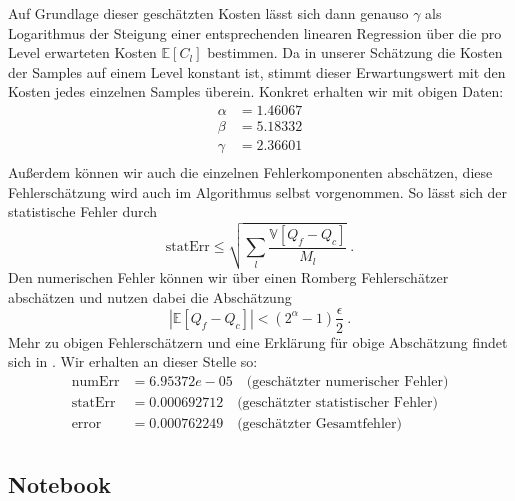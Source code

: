Auf Grundlage dieser geschätzten Kosten lässt sich dann genauso $ \gamma $ als Logarithmus der Steigung einer entsprechenden linearen Regression über die pro Level erwarteten Kosten $ \mathbb{E}[C_l] $ bestimmen. Da in unserer Schätzung die Kosten der Samples auf einem Level konstant ist, stimmt dieser Erwartungswert mit den Kosten jedes einzelnen Samples überein.  
Konkret erhalten wir mit obigen Daten: 
\begin{align*}
	\alpha  &=    1.46067   \\
	\beta   &=    5.18332   \\
	\gamma  &=    2.36601   \\
\end{align*}
Außerdem können wir auch die einzelnen Fehlerkomponenten abschätzen, diese Fehlerschätzung wird auch im Algorithmus selbst vorgenommen. So lässt sich der statistische Fehler durch \[
 \text{statErr} \leq \sqrt{\sum_l   \frac{\mathbb{V}[Q_f-Q_c]}{M_l}} \ . \] 
Den numerischen Fehler können wir über einen Romberg Fehlerschätzer abschätzen und nutzen dabei die Abschätzung \[ \left| \mathbb{E}[Q_f-Q_c] \right| < (2^{\alpha}-1)\frac{\epsilon}{2} \ . \] Mehr zu obigen Fehlerschätzern und eine Erklärung für obige Abschätzung findet sich in \cite{giles_2015}.
Wir erhalten an dieser Stelle so: 
\begin{align*}
\text{numErr}  &= 6.95372e-05   \quad \text{(geschätzter numerischer Fehler)}\\
\text{statErr} &= 0.000692712  \quad  \text{(geschätzter statistischer Fehler)}\\
\text{error}   &= 0.000762249  \quad  \text{(geschätzter Gesamtfehler)}\\
\end{align*}



\subsection{Notebook}

